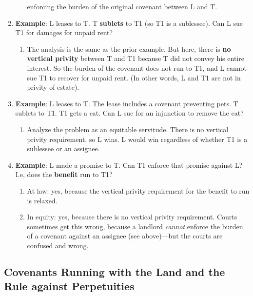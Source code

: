 \begin{enumerate}
\begin{enumerate}
        enforcing the burden of the original covenant between L and T.
    \end{enumerate}
    \item \textbf{Example}: L leases to T. T \textbf{sublets} to T1 (so T1 is 
    a sublessee). Can L sue T1 for damages for unpaid rent?
    \begin{enumerate}
        \item The analysis is the same as the prior example. But here, there 
        is \textbf{no vertical privity} between T and T1 because T did not 
        convey his entire interest. So the burden of the covenant does not run 
        to T1, and L cannot sue T1 to recover for unpaid rent. (In other 
        words, L and T1 are not in privity of estate).
    \end{enumerate}
    \item \textbf{Example}: L leases to T. The lease includes a covenant 
    preventing pets. T sublets to T1. T1 gets a cat. Can L sue for an 
    injunction to remove the cat?
    \begin{enumerate}
        \item Analyze the problem as an equitable servitude. There is no 
        vertical privity requirement, so L wins. L would win regardless of 
        whether T1 is a sublessee or an assignee.
    \end{enumerate}
    \item \textbf{Example}: L made a promise to T. Can T1 enforce that promise 
    against L? I.e, does the \textbf{benefit} run to T1?
    \begin{enumerate}
        \item At law: yes, because the vertical privity requirement for the 
        benefit to run is relaxed.
        \item In equity: yes, because there is no vertical privity 
        requirement. Courts sometimes get this wrong, because a landlord 
        \emph{cannot} enforce the burden of a covenant against an assignee 
        (see above)---but the courts are confused and wrong.
    \end{enumerate}
\end{enumerate}

\subsection{Covenants Running with the Land and the Rule against Perpetuities}

